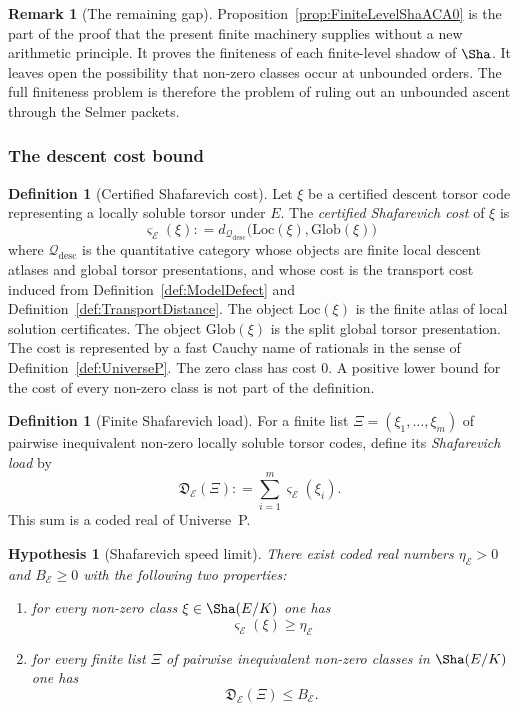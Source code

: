 \documentclass[10pt, reqno]{amsart}
\theoremstyle{plain}
\theoremstyle{definition}
\newtheorem{definition}[theorem]{Definition}
\newtheorem{remark}[theorem]{Remark}
\theoremstyle{plain}
\newtheorem{hypothesis}[theorem]{Hypothesis}
\newcommand{\coloneqq}{\mathrel{\mathop:}=}
\begin{document}
\begin{remark}[The remaining gap]
\label{rem:FiniteLevelNotFullSha}
Proposition~\ref{prop:FiniteLevelShaACA0} is the part of the proof that the present finite machinery supplies without a new arithmetic principle. It proves the finiteness of each finite-level shadow of $\Sha$. It leaves open the possibility that non-zero classes occur at unbounded orders. The full finiteness problem is therefore the problem of ruling out an unbounded ascent through the Selmer packets.
\end{remark}

\subsubsection{The descent cost bound}
\label{subsubsec:DescentCostBound}

\begin{definition}[Certified Shafarevich cost]
\label{def:CertifiedShafarevichCost}
Let $\xi$ be a certified descent torsor code representing a locally soluble torsor under $E$. The \emph{certified Shafarevich cost} of $\xi$ is
\[
  \varsigma_{\mathcal{E}}(\xi)
  \coloneqq
  d_{\mathcal{Q}_{\mathrm{desc}}}
  \bigl(\mathrm{Loc}(\xi),\mathrm{Glob}(\xi)\bigr)
\]
where $\mathcal{Q}_{\mathrm{desc}}$ is the quantitative category whose objects are finite local descent atlases and global torsor presentations, and whose cost is the transport cost induced from Definition~\ref{def:ModelDefect} and Definition~\ref{def:TransportDistance}. The object $\mathrm{Loc}(\xi)$ is the finite atlas of local solution certificates. The object $\mathrm{Glob}(\xi)$ is the split global torsor presentation. The cost is represented by a fast Cauchy name of rationals in the sense of Definition~\ref{def:UniverseP}. The zero class has cost $0$. A positive lower bound for the cost of every non-zero class is not part of the definition.
\end{definition}

\begin{definition}[Finite Shafarevich load]
\label{def:FiniteShafarevichLoad}
For a finite list $\Xi=(\xi_{1},\ldots,\xi_{m})$ of pairwise inequivalent non-zero locally soluble torsor codes, define its \emph{Shafarevich load} by
\[
  \mathfrak{D}_{\mathcal{E}}(\Xi)
  \coloneqq
  \sum_{i=1}^{m}\varsigma_{\mathcal{E}}(\xi_i).
\]
This sum is a coded real of Universe~P.
\end{definition}

\begin{hypothesis}[Shafarevich speed limit]
\label{hyp:ShafarevichCostBound}
There exist coded real numbers $\eta_{\mathcal{E}}>0$ and $B_{\mathcal{E}}\ge 0$ with the following two properties:
\begin{enumerate}
\item[(i)] for every non-zero class $\xi\in\Sha(E/K)$ one has
  \[
    \varsigma_{\mathcal{E}}(\xi)\ge \eta_{\mathcal{E}}
  \]
\item[(ii)] for every finite list $\Xi$ of pairwise inequivalent non-zero classes in $\Sha(E/K)$ one has
  \[
    \mathfrak{D}_{\mathcal{E}}(\Xi)
    \le
    B_{\mathcal{E}}.
  \]
\end{enumerate}
\end{hypothesis}
\end{document}
